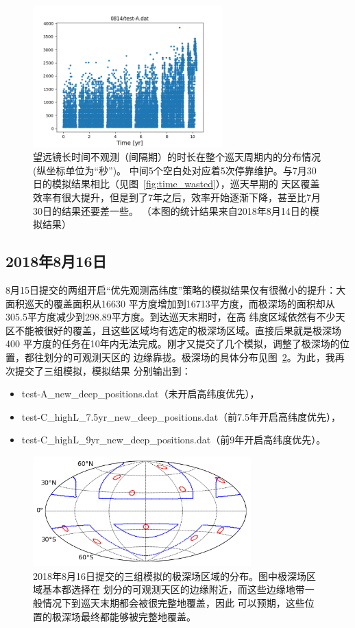 \documentclass[a4paper,11pt]{ctexart}
\begin{document}
\begin{figure}[h!]
\centering
\includegraphics[width=0.65\textwidth]{figures/0814_test-A.png}
\caption{望远镜长时间不观测（间隔期）的时长在整个巡天周期内的分布情况(纵坐标单位为“秒”)。
中间5个空白处对应着5次停靠维护。与7月30日的模拟结果相比（见图~\ref{fig:time_wasted}），巡天早期的
天区覆盖效率有很大提升，但是到了7年之后，效率开始逐渐下降，甚至比7月30日的结果还要差一些。
（本图的统计结果来自2018年8月14日的模拟结果）}
\label{fig:time_wasted_0814}
\end{figure}

\subsection{2018年8月16日} \label{sec:result_2018_8_16}
8月15日提交的两组开启“优先观测高纬度”策略的模拟结果仅有很微小的提升：大面积巡天的覆盖面积从16630
平方度增加到16713平方度，而极深场的面积却从305.5平方度减少到298.89平方度。到达巡天末期时，在高
纬度区域依然有不少天区不能被很好的覆盖，且这些区域均有选定的极深场区域。直接后果就是极深场400
平方度的任务在10年内无法完成。刚才又提交了几个模拟，调整了极深场的位置，都往划分的可观测天区的
边缘靠拢。极深场的具体分布见图~\ref{fig:dist_deep_0816}。为此，我再次提交了三组模拟，模拟结果
分别输出到：
\begin{itemize}
\item test-A\_new\_deep\_positions.dat（未开启高纬度优先）， 
\item test-C\_highL\_7.5yr\_new\_deep\_positions.dat（前7.5年开启高纬度优先），
\item test-C\_highL\_9yr\_new\_deep\_positions.dat（前9年开启高纬度优先）。
\end{itemize}

\begin{figure}[h!]
\centering
\includegraphics[width=0.75\textwidth]{figures/dist_deep_0816.png}
\caption{2018年8月16日提交的三组模拟的极深场区域的分布。图中极深场区域基本都选择在
划分的可观测天区的边缘附近，而这些边缘地带一般情况下到巡天末期都会被很完整地覆盖，因此
可以预期，这些位置的极深场最终都能够被完整地覆盖。}
\label{fig:dist_deep_0816}
\end{figure}
\end{document}
